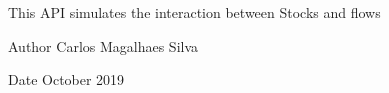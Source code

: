 This A\+PI simulates the interaction between Stocks and flows \begin{DoxyAuthor}{Author}
Carlos Magalhaes Silva 
\end{DoxyAuthor}
\begin{DoxyDate}{Date}
October 2019 
\end{DoxyDate}

